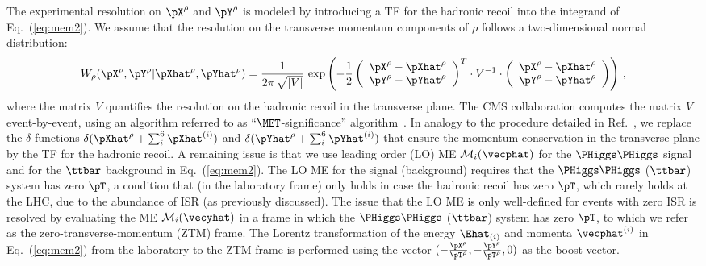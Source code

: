The experimental resolution on $\pX^{\rho}$ and $\pY^{\rho}$ is modeled by introducing a TF for the hadronic recoil into the integrand of Eq.~(\ref{eq:mem2}).
We assume that the resolution on the transverse momentum components of $\rho$ follows a two-dimensional normal distribution:
\begin{equation}
W_{\rho}( \pX^{\rho},\pY^{\rho} | \pXhat^{\rho},\pYhat^{\rho} ) = 
 \frac{1}{2\pi \, \sqrt{\vert V \vert}} \, \exp \left( -\frac{1}{2}
 \left( \begin{array}{c} \pX^{\rho} - \pXhat^{\rho} \\ \pY^{\rho} - \pYhat^{\rho} \end{array} \right)^{T}
  \cdot V^{-1} \cdot
   \left( \begin{array}{c} \pX^{\rho} - \pXhat^{\rho} \\ \pY^{\rho} - \pYhat^{\rho} \end{array} \right)
 \right) \, ,
\label{eq:TF_hadRecoil}
\end{equation}
where the matrix $V$ quantifies the resolution on the hadronic recoil in the transverse plane.
The CMS collaboration computes the matrix $V$ event-by-event, using an algorithm referred to as ``$\MET$-significance'' algorithm~\cite{JME-10-009}.
In analogy to the procedure detailed in Ref.~\cite{SVfitMEM}, we replace the $\delta$-functions 
$\delta( \pXhat^{\rho} + \sum_{i}^{6} \pXhat^{(i)})$ and $\delta( \pYhat^{\rho} + \sum_{i}^{6} \pYhat^{(i)})$
that ensure the momentum conservation in the transverse plane
by the TF for the hadronic recoil.
A remaining issue is that we use leading order (LO) ME $\mathcal{M}_{i}(\vecphat)$ for the $\PHiggs\PHiggs$ signal and for the $\ttbar$ background in Eq.~(\ref{eq:mem2}).
The LO ME for the signal (background) requires that the $\PHiggs\PHiggs$ ($\ttbar$) system has zero $\pT$, 
a condition that (in the laboratory frame) only holds in case the hadronic recoil has zero $\pT$, 
which rarely holds at the LHC, due to the abundance of ISR (as previously discussed).
The issue that the LO ME is only well-defined for events with zero ISR
is resolved by evaluating the ME $\mathcal{M}_{i}(\vecyhat)$ in a frame in which the $\PHiggs\PHiggs$ ($\ttbar$) system has zero $\pT$, 
to which we refer as the zero-transverse-momentum (ZTM) frame.
The Lorentz transformation of the energy $\Ehat_{(i)}$ and momenta $\vecphat^{(i)}$ in Eq.~(\ref{eq:mem2})
from the laboratory to the ZTM frame is performed using the vector $(-\frac{\pX^{\rho}}{\pT^{\rho}},-\frac{\pY^{\rho}}{\pT^{\rho}},0)$ as the boost vector.

